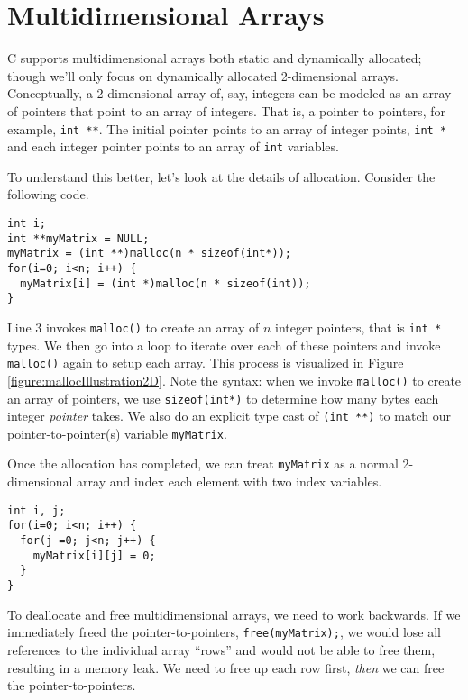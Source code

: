 \section{Multidimensional Arrays}

C supports multidimensional arrays both static and dynamically
allocated; though we'll only focus on dynamically allocated 2-dimensional
arrays.  Conceptually, a 2-dimensional array of, say, integers can
be modeled as an array of pointers that point to an array of integers.
That is, a pointer to pointers, for example, \texttt{int **}.  
The initial pointer points to an array of integer points, \texttt{int *}
and each integer pointer points to an array of \texttt{int} variables.

To understand this better, let's look at the details of allocation.  Consider
the following code.

\begin{verbatim}
int i;
int **myMatrix = NULL; 
myMatrix = (int **)malloc(n * sizeof(int*)); 
for(i=0; i<n; i++) {
  myMatrix[i] = (int *)malloc(n * sizeof(int)); 
}
\end{verbatim}

Line 3 invokes \texttt{malloc()} to create an array of $n$ integer
pointers, that is \texttt{int *} types.  We then go into a loop to
iterate over each of these pointers and invoke \texttt{malloc()} 
again to setup each array.  This process is visualized in Figure 
\ref{figure:mallocIllustration2D}.  Note the syntax: when we invoke \texttt{malloc()} to 
create an array of pointers, we use \texttt{sizeof(int*)} to
determine how many bytes each integer \emph{pointer} takes.  We
also do an explicit type cast of \texttt{(int **)} to match our
pointer-to-pointer(s) variable \texttt{myMatrix}.  



Once the allocation has completed, we can treat \texttt{myMatrix}
as a normal 2-dimensional array and index each element with two
index variables.

\begin{verbatim}
int i, j;
for(i=0; i<n; i++) {
  for(j =0; j<n; j++) {
    myMatrix[i][j] = 0;
  }
}
\end{verbatim}

To deallocate and free multidimensional arrays, we need to work backwards.
If we immediately freed the pointer-to-pointers, \texttt{free(myMatrix);}, 
we would lose all references to the individual array ``rows'' and would not
be able to free them, resulting in a \gls{memory leak}.  We need to free up 
each row first, \emph{then} we can free the pointer-to-pointers.

